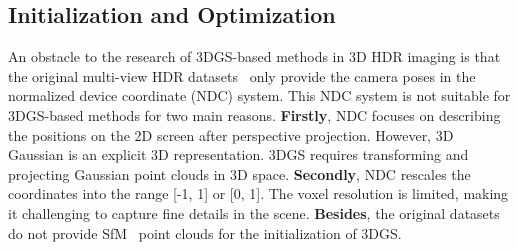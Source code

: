\documentclass{article}
\begin{document}
\subsection{Initialization and Optimization}
An obstacle to the research of 3DGS-based methods in 3D HDR imaging is that the original multi-view HDR datasets~\cite{hdr_nerf} only provide the camera poses in the normalized device coordinate (NDC) system. This NDC system is not suitable for 3DGS-based methods for two main reasons. \textbf{Firstly}, NDC focuses on describing the positions on the 2D screen after perspective projection. However, 3D Gaussian is an explicit 3D representation. 3DGS requires transforming and projecting Gaussian point clouds in 3D space. \textbf{Secondly}, NDC rescales the coordinates into the range [-1, 1] or [0, 1]. The voxel resolution is limited, making it challenging to capture fine details in the scene. \textbf{Besides}, the original datasets~\cite{hdr_nerf} do not provide SfM~\cite{sfm} point clouds for the initialization of 3DGS.

\end{document}
